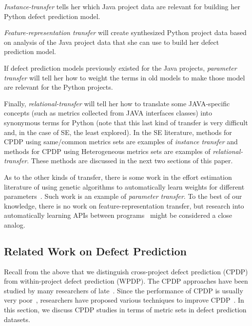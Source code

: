 \squishlist
\item
{\em Instance-transfer} tells her which Java project data are relevant
for building her Python defect prediction model.
\item
{\em Feature-representation transfer} will create synthesized Python
project data based on analysis of the Java project data that she can
use to build her defect prediction model.  
\item
If defect prediction models previously existed for the Java projects,
{\em parameter transfer} will tell her how to weight the terms in old
models to make those model are relevant for the Python projects.
\item
Finally, {\em relational-transfer} will tell her how to translate some
JAVA-specific concepts (such as metrics collected from JAVA interfaces
classes) into synonymous terms for Python (note that this last kind
of transfer is very difficult and, in the case of SE, the least
explored).
\squishend
In the SE literature, methods for CPDP using same/common metrics sets are examples 
of {\em instance transfer} and methods for CPDP using Heterogeneous metrics sets are examples
of {\em relational-transfer}. These methods are discussed in the next two sections of this paper.

As to the other kinds of transfer, there is some work in the effort estimation literature of using
genetic algorithms to automatically learn weights for different parameters~\cite{sigweni2014feature}. Such work is an example of {\em parameter transfer}.
To the best of our knowledge, there is no work on feature-representation transfer, but research into automatically
learning APIs between programs~\cite{dallmeier2012automatically} might be considered a close analog.



\subsection{Related Work on Defect Prediction}
\label{sec:Background}
Recall from the above that we distinguish cross-project defect prediction (CPDP) from within-project defect prediction (WPDP).
The CPDP approaches have been studied by many researchers
of late~\cite{Canfora13,Ma12,Nam13,Panichella14,Rahman12,Ryu14,Ryu15,Turhan09,Zhang15,Zimmermann09}. Since the performance
of CPDP is usually very poor~\cite{Zimmermann09}, researchers have proposed various techniques to
improve CPDP~\cite{Canfora13,Ma12,Nam13,Panichella14,Ryu14,Ryu15,Turhan09,Watanabe08}. In this section, we discuss CPDP studies in terms of metric sets in defect prediction datasets.

